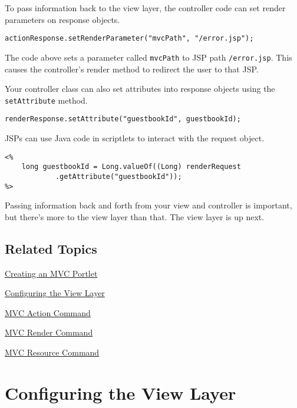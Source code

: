 To pass information back to the view layer, the controller code can set
render parameters on response objects.

\begin{verbatim}
actionResponse.setRenderParameter("mvcPath", "/error.jsp");
\end{verbatim}

The code above sets a parameter called \texttt{mvcPath} to JSP path
\texttt{/error.jsp}. This causes the controller's render method to
redirect the user to that JSP.

Your controller class can also set attributes into response objects
using the \texttt{setAttribute} method.

\begin{verbatim}
renderResponse.setAttribute("guestbookId", guestbookId);
\end{verbatim}

JSPs can use Java code in scriptlets to interact with the request
object.

\begin{verbatim}
<%
    long guestbookId = Long.valueOf((Long) renderRequest
            .getAttribute("guestbookId"));
%>
\end{verbatim}

Passing information back and forth from your view and controller is
important, but there's more to the view layer than that. The view layer
is up next.

\section{Related Topics}\label{related-topics-4}

\href{/docs/7-2/appdev/-/knowledge_base/a/creating-an-mvc-portlet}{Creating
an MVC Portlet}

\href{/docs/7-2/appdev/-/knowledge_base/a/configuring-the-view-layer}{Configuring
the View Layer}

\href{/docs/7-2/appdev/-/knowledge_base/a/mvc-action-command}{MVC Action
Command}

\href{/docs/7-2/appdev/-/knowledge_base/a/mvc-render-command}{MVC Render
Command}

\href{/docs/7-2/appdev/-/knowledge_base/a/mvc-resource-command}{MVC
Resource Command}

\chapter{Configuring the View Layer}\label{configuring-the-view-layer}

